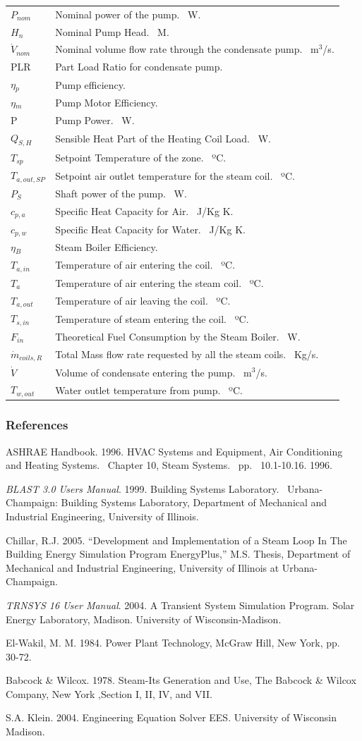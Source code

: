 \begin{longtable}[c]{p{1.0in}p{4.0in}}
\(P_{nom}\) & Nominal power of the pump.~ W. \tabularnewline
\(H_{n}\) & Nominal Pump Head.~ M. \tabularnewline
\(\dot V_{nom}\) & Nominal volume flow rate through the condensate pump.~ m\(^3\)/s. \tabularnewline
PLR & Part Load Ratio for condensate pump. \tabularnewline
\(\eta\)\(_{p}\) & Pump efficiency. \tabularnewline
\(\eta\)\(_{m}\) & Pump Motor Efficiency. \tabularnewline
P & Pump Power.~ W. \tabularnewline
\(Q_{S,H}\) & Sensible Heat Part of the Heating Coil Load.~ W. \tabularnewline
\(T_{sp}\) & Setpoint Temperature of the zone.~ ºC. \tabularnewline
\(T_{a,out,SP}\) & Setpoint air outlet temperature for the steam coil.~ ºC. \tabularnewline
\(P_{S}\) & Shaft power of the pump.~ W. \tabularnewline
\(c_{p,a}\) & Specific Heat Capacity for Air.~ J/Kg K. \tabularnewline
\(c_{p,w}\) & Specific Heat Capacity for Water.~ J/Kg K. \tabularnewline
\(\eta\)\(_{B}\) & Steam Boiler Efficiency. \tabularnewline
\(T_{a,in}\) & Temperature of air entering the coil.~ ºC. \tabularnewline
\(T_{a}\) & Temperature of air entering the steam coil.~ ºC. \tabularnewline
\(T_{a,out}\) & Temperature of air leaving the coil.~ ºC. \tabularnewline
\(T_{s,in}\) & Temperature of steam entering the coil.~ ºC. \tabularnewline
\(F_{in}\) & Theoretical Fuel Consumption by the Steam Boiler.~ W. \tabularnewline
\(\dot m_{coils,R}\) & Total Mass flow rate requested by all the steam coils.~ Kg/s. \tabularnewline
\(\dot V\) & Volume of condensate entering the pump.~ m\(^3\)/s. \tabularnewline
\(T_{w,out}\) & Water outlet temperature from pump.~ ºC. \tabularnewline
\bottomrule
\end{longtable}

\subsubsection{References}\label{references-007}

ASHRAE Handbook. 1996. HVAC Systems and Equipment, Air Conditioning and Heating Systems.~ Chapter 10, Steam Systems.~ pp.\emph{~} 10.1-10.16. 1996.

\emph{BLAST 3.0 Users Manual}. 1999. Building Systems Laboratory.~ Urbana-Champaign: Building Systems Laboratory, Department of Mechanical and Industrial Engineering, University of Illinois.

Chillar, R.J. 2005. ``Development and Implementation of a Steam Loop In The Building Energy Simulation Program EnergyPlus,'' M.S. Thesis, Department of Mechanical and Industrial Engineering, University of Illinois at Urbana-Champaign.

\emph{TRNSYS 16 User Manual}. 2004. A Transient System Simulation Program. Solar Energy Laboratory, Madison. University of Wisconsin-Madison.

El-Wakil, M. M. 1984. Power Plant Technology, McGraw Hill, New York, pp.~~ 30-72.

Babcock \& Wilcox. 1978. Steam-Its Generation and Use, The Babcock \& Wilcox Company, New York ,Section I, II, IV, and VII.

S.A. Klein. 2004. Engineering Equation Solver EES. University of Wisconsin Madison.
